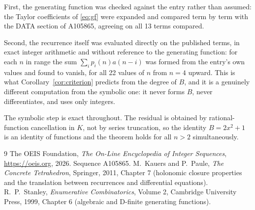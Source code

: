 \documentclass[11pt,a4paper]{article}
\theoremstyle{plain}
\theoremstyle{definition}
\begin{document}
First, the generating function was checked against the entry rather than assumed: the
Taylor coefficients of \eqref{eq:gf} were expanded and compared term by term with the DATA
section of A105865, agreeing on all 13 terms compared.

Second, the recurrence itself was evaluated directly on the published terms, in exact
integer arithmetic and without reference to the generating function: for each $n$ in range
the sum $\sum_{i}p_{i}(n)a(n-i)$ was formed from the entry's own values and found to
vanish, for all 22 values of $n$ from $n=4$ upward. This is what
Corollary~\ref{cor:criterion} predicts from the degree of $B$, and it is a genuinely
different computation from the symbolic one: it never forms $B$, never differentiates, and
uses only integers.

The symbolic step is exact throughout. The residual is obtained by rational-function
cancellation in $K$, not by series truncation, so the identity $B=2 x^{2} + 1$ is an
identity of functions and the theorem holds for all $n>2$ simultaneously.

\begin{thebibliography}{9}
 The OEIS Foundation, \emph{The On-Line Encyclopedia of Integer Sequences},
\url{https://oeis.org}, 2026. Sequence A105865.
 M.~Kauers and P.~Paule, \emph{The Concrete Tetrahedron}, Springer, 2011,
Chapter 7 (holonomic closure properties and the translation between recurrences and
differential equations).
 R.~P.~Stanley, \emph{Enumerative Combinatorics}, Volume 2, Cambridge
University Press, 1999, Chapter 6 (algebraic and D-finite generating functions).
\end{thebibliography}
\end{document}
